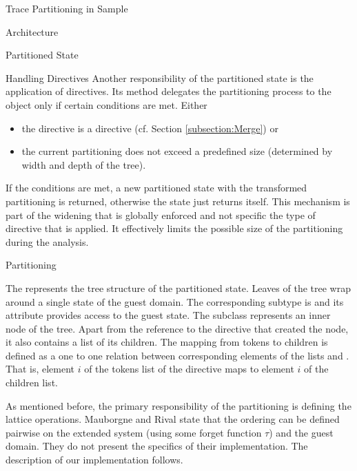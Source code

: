 \begin{chapter}{Trace Partitioning in Sample}
\begin{section}{Architecture}
\begin{subsection}{Partitioned State}

			\begin{subsubsection}{Handling Directives}
				Another responsibility of the partitioned state is the application of directives. Its  method delegates the partitioning process to the  object only if certain conditions are met. Either
				\begin{itemize}
					\item the directive is a  directive (cf. Section \ref{subsection:Merge}) or
					\item the current partitioning does not exceed a predefined size (determined by width and depth of the tree).
				\end{itemize}
				If the conditions are met, a new partitioned state with the transformed partitioning is returned, otherwise the state just returns itself. This mechanism is part of the widening that is globally enforced and not specific the type of directive that is applied. It effectively limits the possible size of the partitioning during the analysis.
			\end{subsubsection}
		\end{subsection}


		\begin{subsection}{Partitioning}
			\label{subsection:Partitioning}

			The  represents the tree structure of the partitioned state. Leaves of the tree wrap around a single state of the guest domain. The corresponding subtype is  and its  attribute provides access to the guest state. The  subclass represents an inner node of the tree. Apart from the reference to the directive that created the node, it also contains a list of its children. The mapping from tokens to children is defined as a one to one relation between corresponding elements of the lists  and . That is, element $i$ of the tokens list of the directive maps to element $i$ of the children list. 

			As mentioned before, the primary responsibility of the partitioning is defining the lattice operations. Mauborgne and Rival state that the ordering can be defined pairwise on the extended system (using some forget function $\tau$) and the guest domain. They do not present the specifics of their implementation. The description of our implementation follows.


\end{subsection}
\end{section}
\end{chapter}
